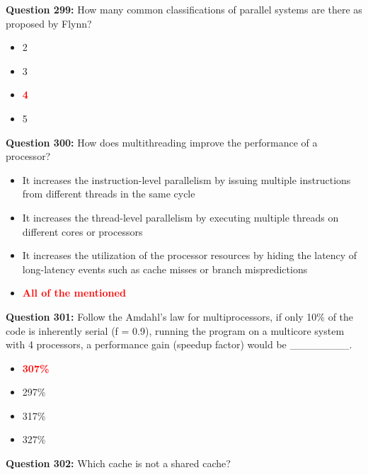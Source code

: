\documentclass[12pt,a4paper]{article}
\begin{document}
\textbf{Question 299:} How many common classifications of parallel systems are there as proposed by Flynn?

\begin{itemize}
    \item[\textbf{A.}] 2
    \item[\textbf{B.}] 3
    \item[\textbf{C.}] \textcolor{red}{\textbf{4}}
    \item[\textbf{D.}] 5
\end{itemize}

\vspace{0.5cm}

\textbf{Question 300:} How does multithreading improve the performance of a processor?

\begin{itemize}
    \item[\textbf{A.}] It increases the instruction-level parallelism by issuing multiple instructions from different threads in the same cycle
    \item[\textbf{B.}] It increases the thread-level parallelism by executing multiple threads on different cores or processors
    \item[\textbf{C.}] It increases the utilization of the processor resources by hiding the latency of long-latency events such as cache misses or branch mispredictions
    \item[\textbf{D.}] \textcolor{red}{\textbf{All of the mentioned}}
\end{itemize}

\vspace{0.5cm}

\textbf{Question 301:} Follow the Amdahl's law for multiprocessors, if only 10\% of the code is inherently serial (f = 0.9), running the program on a multicore system with 4 processors, a performance gain (speedup factor) would be ________.

\begin{itemize}
    \item[\textbf{A.}] \textcolor{red}{\textbf{307\%}}
    \item[\textbf{B.}] 297\%
    \item[\textbf{C.}] 317\%
    \item[\textbf{D.}] 327\%
\end{itemize}

\vspace{0.5cm}

\textbf{Question 302:} Which cache is not a shared cache?
\end{document}
